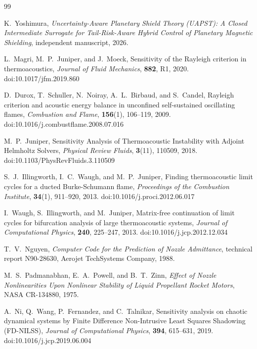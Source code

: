 \begin{thebibliography}{99}

K.~Yoshimura,
\newblock \emph{Uncertainty-Aware Planetary Shield Theory (UAPST):
A Closed Intermediate Surrogate for Tail-Risk-Aware Hybrid Control of Planetary Magnetic Shielding},
\newblock independent manuscript, 2026.

L.~Magri, M.~P.~Juniper, and J.~Moeck,
\newblock Sensitivity of the Rayleigh criterion in thermoacoustics,
\newblock \emph{Journal of Fluid Mechanics}, \textbf{882}, R1, 2020.
\newblock doi:10.1017/jfm.2019.860

D.~Durox, T.~Schuller, N.~Noiray, A.~L.~Birbaud, and S.~Candel,
\newblock Rayleigh criterion and acoustic energy balance in unconfined self-sustained oscillating flames,
\newblock \emph{Combustion and Flame}, \textbf{156}(1), 106--119, 2009.
\newblock doi:10.1016/j.combustflame.2008.07.016

M.~P.~Juniper,
\newblock Sensitivity Analysis of Thermoacoustic Instability with Adjoint Helmholtz Solvers,
\newblock \emph{Physical Review Fluids}, \textbf{3}(11), 110509, 2018.
\newblock doi:10.1103/PhysRevFluids.3.110509

S.~J.~Illingworth, I.~C.~Waugh, and M.~P.~Juniper,
\newblock Finding thermoacoustic limit cycles for a ducted Burke-Schumann flame,
\newblock \emph{Proceedings of the Combustion Institute}, \textbf{34}(1), 911--920, 2013.
\newblock doi:10.1016/j.proci.2012.06.017

I.~Waugh, S.~Illingworth, and M.~Juniper,
\newblock Matrix-free continuation of limit cycles for bifurcation analysis of large thermoacoustic systems,
\newblock \emph{Journal of Computational Physics}, \textbf{240}, 225--247, 2013.
\newblock doi:10.1016/j.jcp.2012.12.034

T.~V.~Nguyen,
\newblock \emph{Computer Code for the Prediction of Nozzle Admittance},
\newblock technical report N90-28630, Aerojet TechSystems Company, 1988.

M.~S.~Padmanabhan, E.~A.~Powell, and B.~T.~Zinn,
\newblock \emph{Effect of Nozzle Nonlinearities Upon Nonlinear Stability of Liquid Propellant Rocket Motors},
\newblock NASA CR-134880, 1975.

A.~Ni, Q.~Wang, P.~Fernandez, and C.~Talnikar,
\newblock Sensitivity analysis on chaotic dynamical systems by Finite Difference Non-Intrusive Least Squares Shadowing (FD-NILSS),
\newblock \emph{Journal of Computational Physics}, \textbf{394}, 615--631, 2019.
\newblock doi:10.1016/j.jcp.2019.06.004

\end{thebibliography}